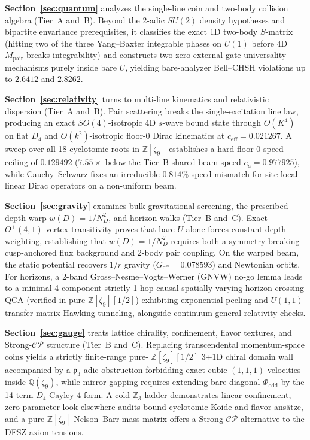 \textbf{Section~\ref{sec:quantum}} analyzes the single-line coin and two-body collision algebra (Tier~A and~B). Beyond
the 2-adic $SU(2)$ density hypotheses and bipartite envariance prerequisites, it classifies the exact 1D two-body
$S$-matrix (hitting two of the three Yang--Baxter integrable phases on $U(1)$ before 4D $M_{\mathrm{pair}}$ breaks
integrability) and constructs two zero-external-gate universality mechanisms purely inside bare $U$, yielding
bare-analyzer Bell--CHSH violations up to $2.6412$ and $2.8262$.

\textbf{Section~\ref{sec:relativity}} turns to multi-line kinematics and relativistic dispersion (Tier~A and~B). Pair
scattering breaks the single-excitation line law, producing an exact $SO(4)$-isotropic 4D $s$-wave bound state through
$O(K^4)$ on flat $D_4$ and $O(k^2)$-isotropic floor-0 Dirac kinematics at $c_{\mathrm{eff}} = 0.021267$. A sweep over
all 18 cyclotomic roots in $\mathbb{Z}[\zeta_9]$ establishes a hard floor-0 speed ceiling of $0.129492$ ($7.55\times$
below the Tier~B shared-beam speed $c_u = 0.977925$), while Cauchy--Schwarz fixes an irreducible $0.814\%$ speed
mismatch for site-local linear Dirac operators on a non-uniform beam.

\textbf{Section~\ref{sec:gravity}} examines bulk gravitational screening, the prescribed depth warp $w(D) = 1/N_D^2$,
and horizon walks (Tier~B and~C). Exact $O^+(4,1)$ vertex-transitivity proves that bare $U$ alone forces constant depth
weighting, establishing that $w(D) = 1/N_D^2$ requires both a symmetry-breaking cusp-anchored flux background and
2-body pair coupling. On the warped beam, the static potential recovers $1/r$ gravity ($G_{\mathrm{eff}} = 0.078593$)
and Newtonian orbits. For horizons, a 2-band Gross--Nesme--Vogts--Werner (GNVW) no-go lemma leads to a minimal
4-component strictly 1-hop-causal spatially varying horizon-crossing QCA (verified in pure 
$\mathbb{Z}[\zeta_9][1/2]$) exhibiting exponential peeling and $U(1,1)$ transfer-matrix Hawking tunneling, alongside
continuum general-relativity checks.

\textbf{Section~\ref{sec:gauge}} treats lattice chirality, confinement, flavor textures, and Strong-$\mathcal{CP}$
structure (Tier~B and~C). Replacing transcendental momentum-space coins yields a strictly finite-range pure-
$\mathbb{Z}[\zeta_9][1/2]$ 3+1D chiral domain wall accompanied by a $\mathfrak{p}_3$-adic obstruction forbidding exact
cubic $(1,1,1)$ velocities inside $\mathbb{Q}(\zeta_9)$, while mirror gapping requires extending bare diagonal
$\Phi_{\mathrm{odd}}$ by the 14-term $D_4$ Cayley 4-form. A cold $\mathbb{Z}_3$ ladder demonstrates linear
confinement, zero-parameter look-elsewhere audits bound cyclotomic Koide and flavor ans\"atze, and a pure-$\mathbb{Z}[\zeta_9]$
Nelson--Barr mass matrix offers a Strong-$\mathcal{CP}$ alternative to the DFSZ axion tensions.

